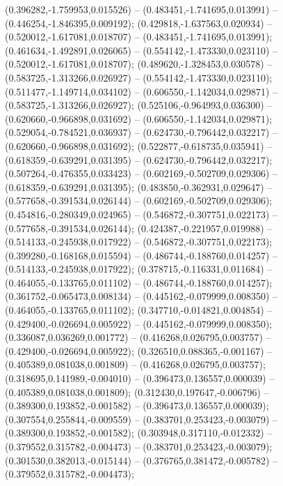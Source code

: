  (0.396282,-1.759953,0.015526) -- (0.483451,-1.741695,0.013991) -- (0.446254,-1.846395,0.009192);
 (0.429818,-1.637563,0.020934) -- (0.520012,-1.617081,0.018707) -- (0.483451,-1.741695,0.013991);
 (0.461634,-1.492891,0.026065) -- (0.554142,-1.473330,0.023110) -- (0.520012,-1.617081,0.018707);
 (0.489620,-1.328453,0.030578) -- (0.583725,-1.313266,0.026927) -- (0.554142,-1.473330,0.023110);
 (0.511477,-1.149714,0.034102) -- (0.606550,-1.142034,0.029871) -- (0.583725,-1.313266,0.026927);
 (0.525106,-0.964993,0.036300) -- (0.620660,-0.966898,0.031692) -- (0.606550,-1.142034,0.029871);
 (0.529054,-0.784521,0.036937) -- (0.624730,-0.796442,0.032217) -- (0.620660,-0.966898,0.031692);
 (0.522877,-0.618735,0.035941) -- (0.618359,-0.639291,0.031395) -- (0.624730,-0.796442,0.032217);
 (0.507264,-0.476355,0.033423) -- (0.602169,-0.502709,0.029306) -- (0.618359,-0.639291,0.031395);
 (0.483850,-0.362931,0.029647) -- (0.577658,-0.391534,0.026144) -- (0.602169,-0.502709,0.029306);
 (0.454816,-0.280349,0.024965) -- (0.546872,-0.307751,0.022173) -- (0.577658,-0.391534,0.026144);
 (0.424387,-0.221957,0.019988) -- (0.514133,-0.245938,0.017922) -- (0.546872,-0.307751,0.022173);
 (0.399280,-0.168168,0.015594) -- (0.486744,-0.188760,0.014257) -- (0.514133,-0.245938,0.017922);
 (0.378715,-0.116331,0.011684) -- (0.464055,-0.133765,0.011102) -- (0.486744,-0.188760,0.014257);
 (0.361752,-0.065473,0.008134) -- (0.445162,-0.079999,0.008350) -- (0.464055,-0.133765,0.011102);
 (0.347710,-0.014821,0.004854) -- (0.429400,-0.026694,0.005922) -- (0.445162,-0.079999,0.008350);
 (0.336087,0.036269,0.001772) -- (0.416268,0.026795,0.003757) -- (0.429400,-0.026694,0.005922);
 (0.326510,0.088365,-0.001167) -- (0.405389,0.081038,0.001809) -- (0.416268,0.026795,0.003757);
 (0.318695,0.141989,-0.004010) -- (0.396473,0.136557,0.000039) -- (0.405389,0.081038,0.001809);
 (0.312430,0.197647,-0.006796) -- (0.389300,0.193852,-0.001582) -- (0.396473,0.136557,0.000039);
 (0.307554,0.255844,-0.009559) -- (0.383701,0.253423,-0.003079) -- (0.389300,0.193852,-0.001582);
 (0.303948,0.317110,-0.012332) -- (0.379552,0.315782,-0.004473) -- (0.383701,0.253423,-0.003079);
 (0.301530,0.382013,-0.015144) -- (0.376765,0.381472,-0.005782) -- (0.379552,0.315782,-0.004473);
